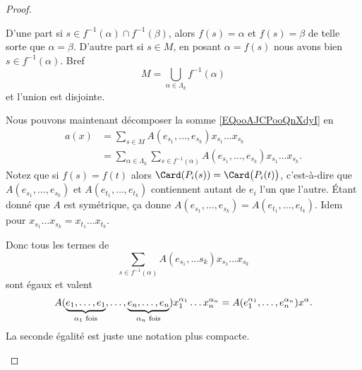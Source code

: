 \begin{proof}
\begin{subproof}
		D'une part si \( s\in f^{-1}(\alpha)\cap f^{-1}(\beta)\), alors \( f(s)=\alpha\) et \( f(s)=\beta\) de telle sorte que \( \alpha=\beta\). D'autre part si \( s\in M\), en posant \( \alpha=f(s)\) nous avons bien \( s\in f^{-1}(\alpha)\). Bref
		\begin{equation}
			M=\bigcup_{\alpha\in \Lambda_k}f^{-1}(\alpha)
		\end{equation}
		et l'union est disjointe.

		Nous pouvons maintenant décomposer la somme \eqref{EQooAJCPooQnXdyI} en
		\begin{subequations}
			\begin{align}
				a(x) & =\sum_{s\in M}A(e_{s_1},\ldots,e_{s_k})x_{s_1}\ldots x_{s_k}                                          \\
				     & =\sum_{\alpha\in\Lambda_k}\sum_{s\in f^{-1}(\alpha)}  A(e_{s_1},\ldots,e_{s_k})x_{s_1}\ldots x_{s_k}.
			\end{align}
		\end{subequations}
		Notez que si \( f(s)=f(t)\) alors \( \Card(P_i(s))=\Card\big( P_i(t) \big)\), c'est-à-dire que \( A(e_{s_1},\ldots,e_{s_k}) \) et \( A(e_{t_1},\ldots,e_{t_k})\) contiennent autant de \( e_i\) l'un que l'autre. Étant donné que \( A\) est symétrique, ça donne \( A(e_{s_1},\ldots, e_{s_k})=A(e_{t_1},\ldots,e_{t_k})\). Idem pour \( x_{s_1}\ldots x_{s_k}=x_{t_1}\ldots x_{t_k}\).

		Donc tous les termes de
		\begin{equation}
			\sum_{s\in f^{-1}(\alpha)}A(e_{s_1},\ldots s_k)x_{s_1}\ldots x_{s_k}
		\end{equation}
		sont égaux et valent
		\begin{equation}		\label{EQooCUAOooWhhhAY}
			A(\underbrace{e_1,\ldots,e_1}_{\text{\( \alpha_1\) fois}},\ldots,\underbrace{e_n,\ldots,e_n}_{\text{\( \alpha_n\) fois}})x_1^{\alpha_1}\ldots x_n^{\alpha_n}=A(e_1^{\alpha_1},\ldots,e_n^{\alpha_n})x^{\alpha}.
		\end{equation}
		La seconde égalité est juste une notation plus compacte.


\end{subproof}
\end{proof}
